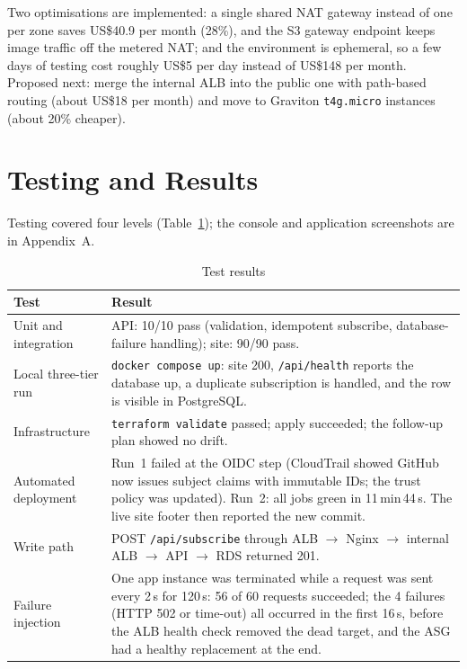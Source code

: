 \documentclass[10pt,a4paper]{article}
\newcommand{\hdr}{\rowcolor{rowblue}}
\begin{document}
\noindent Two optimisations are implemented: a single shared NAT gateway instead of one per zone saves US\$40.9 per month (28\%), and the S3
gateway endpoint keeps image traffic off the metered NAT; and the environment is ephemeral, so a few days of testing cost roughly US\$5 per day
instead of US\$148 per month. Proposed next: merge the internal ALB into the public one with path-based routing (about US\$18 per month) and move to
Graviton \texttt{t4g.micro} instances (about 20\% cheaper).

\section{Testing and Results}
Testing covered four levels (Table~\ref{tab:tests}); the console and application screenshots are in Appendix~A.

\begin{table}[H]
\centering\small
\caption{Test results}\label{tab:tests}
\begin{tabular}{@{}p{3.3cm} p{10.4cm}@{}}
\toprule
\hdr Test & Result\\
\midrule
Unit and integration & API: 10/10 pass (validation, idempotent subscribe, database-failure handling); site: 90/90 pass.\\
Local three-tier run & \texttt{docker compose up}: site 200, \texttt{/api/health} reports the database up, a duplicate subscription is handled, and the row is visible in PostgreSQL.\\
Infrastructure & \texttt{terraform validate} passed; apply succeeded; the follow-up plan showed no drift.\\
Automated deployment & Run~1 failed at the OIDC step (CloudTrail showed GitHub now issues subject claims with immutable IDs; the trust policy was updated). Run~2: all jobs green in 11\,min\,44\,s. The live site footer then reported the new commit.\\
Write path & POST \texttt{/api/subscribe} through ALB $\to$ Nginx $\to$ internal ALB $\to$ API $\to$ RDS returned 201.\\
Failure injection & One app instance was terminated while a request was sent every 2\,s for 120\,s: 56 of 60 requests succeeded; the 4 failures (HTTP 502 or time-out) all occurred in the first 16\,s, before the ALB health check removed the dead target, and the ASG had a healthy replacement at the end.\\
\bottomrule
\end{tabular}
\end{table}
\end{document}
